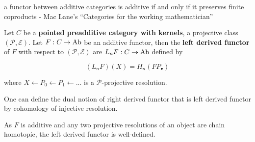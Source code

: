 \begin{remark}
	a functor between additive categories is additive if and only if it preserves finite coproducts
	- Mac Lane's “Categories for the working mathematician”
\end{remark}


\begin{comment}
	\begin{definition}[right exact functor]
		Let $C, D$ be \textbf{pointed preadditive categories with kernels}, a projective class $(\mathcal{P}, \mathcal{E})$ and a short exact sequence
		$$
		0 \to A \to B \to C \to 0
		$$
		
		A functor $F: C \to D$ is called left exact if
		$$
		0 \to F(A) \to F(B) \to F(C)
		$$
		
		is exact
		
	\end{definition}
	
	\note{TODO - on the behavior of functor on zero object}
	
	\begin{remark}
		In an \textbf{abelian category}, every left exact functor is additive.
	\end{remark}
\end{comment}

\begin{definition}
	Let $C$ be a \textbf{pointed preadditive category with kernels}, a projective class $(\mathcal{P}, \mathcal{E})$. Let $F: C \to \operatorname{Ab}$ be an additive functor, then the \textbf{left derived functor} of $F$ with respect to $(\mathcal{P}, \mathcal{E})$ are $L_n F: C \to \operatorname{Ab}$ defined by
	
	$$
	(L_n F) (X) = H_n(F P_\bullet)
	$$
	
	where $X \leftarrow P_0 \leftarrow P_1 \leftarrow ...$ is a $\mathcal{P}$-projective resolution.
\end{definition}

\begin{remark}
	One can define the dual notion of right derived functor that is left derived functor by cohomology of injective resolution.
\end{remark}

\begin{remark}
	As $F$ is additive and any two projective resolutions of an object are chain homotopic, the left derived functor is well-defined.
\end{remark}

